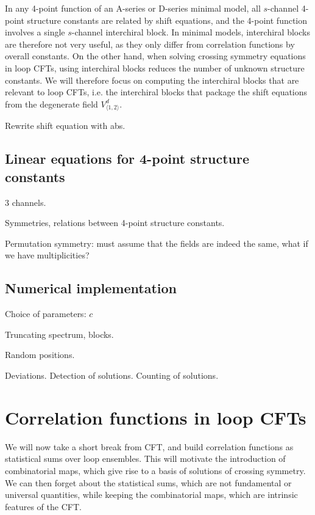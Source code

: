 \documentclass[12pt, a4paper]{article}
\theoremstyle{break}
\begin{document}
In any 4-point function of an A-series or D-series minimal model, all $s$-channel 4-point structure constants are related by shift equations, and the 4-point function involves a single $s$-channel interchiral block. In minimal models, interchiral blocks are therefore not very useful, as they only differ from correlation functions by overall constants. On the other hand, when solving crossing symmetry equations in loop CFTs, using interchiral blocks reduces the number of unknown structure constants. We will therefore focus on computing the interchiral blocks that are relevant to loop CFTs, i.e. the interchiral blocks that package the shift equations from the degenerate field $V^d_{\langle 1,2\rangle}$.  




Rewrite shift equation with abs. 

\subsection{Linear equations for 4-point structure constants}

3 channels. 

Symmetries, relations between 4-point structure constants. 

Permutation symmetry: must assume that the fields are indeed the same, what if we have multiplicities? 

\subsection{Numerical implementation}

Choice of parameters: $c$

Truncating spectrum, blocks.

Random positions.

Deviations. Detection of solutions. Counting of solutions.


\section{Correlation functions in loop CFTs} \label{sec:cloop}

We will now take a short break from CFT, and build correlation functions as statistical sums over loop ensembles. This will motivate the introduction of combinatorial maps, which give rise to a basis of solutions of crossing symmetry. We can then forget about the statistical sums, which are not fundamental or universal quantities, while keeping the combinatorial maps, which are intrinsic features of the CFT.
\end{document}
